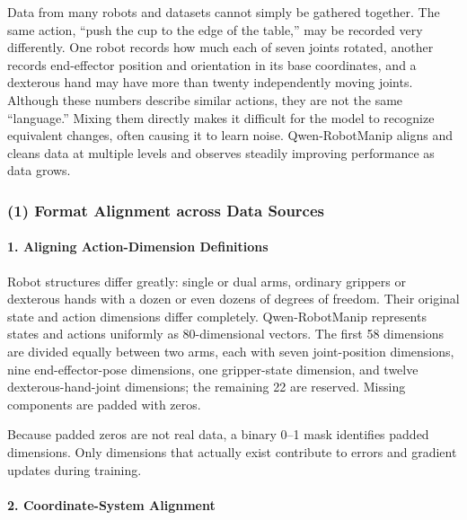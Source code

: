 Data from many robots and datasets cannot simply be gathered together. The same action, ``push the cup to the edge of the table,'' may be recorded very differently. One robot records how much each of seven joints rotated, another records end-effector position and orientation in its base coordinates, and a dexterous hand may have more than twenty independently moving joints. Although these numbers describe similar actions, they are not the same ``language.'' Mixing them directly makes it difficult for the model to recognize equivalent changes, often causing it to learn noise. Qwen-RobotManip aligns and cleans data at multiple levels and observes steadily improving performance as data grows.

\hypertarget{format-alignment-across-data-sources}{%
\subsubsection{(1) Format Alignment across Data Sources}\label{format-alignment-across-data-sources}}

\hypertarget{aligning-action-dimension-definitions}{%
\paragraph{1. Aligning Action-Dimension Definitions}\label{aligning-action-dimension-definitions}}

Robot structures differ greatly: single or dual arms, ordinary grippers or dexterous hands with a dozen or even dozens of degrees of freedom. Their original state and action dimensions differ completely. Qwen-RobotManip represents states and actions uniformly as 80-dimensional vectors. The first 58 dimensions are divided equally between two arms, each with seven joint-position dimensions, nine end-effector-pose dimensions, one gripper-state dimension, and twelve dexterous-hand-joint dimensions; the remaining 22 are reserved. Missing components are padded with zeros.

Because padded zeros are not real data, a binary 0--1 mask identifies padded dimensions. Only dimensions that actually exist contribute to errors and gradient updates during training.

\hypertarget{coordinate-system-alignment}{%
\paragraph{2. Coordinate-System Alignment}\label{coordinate-system-alignment}}

